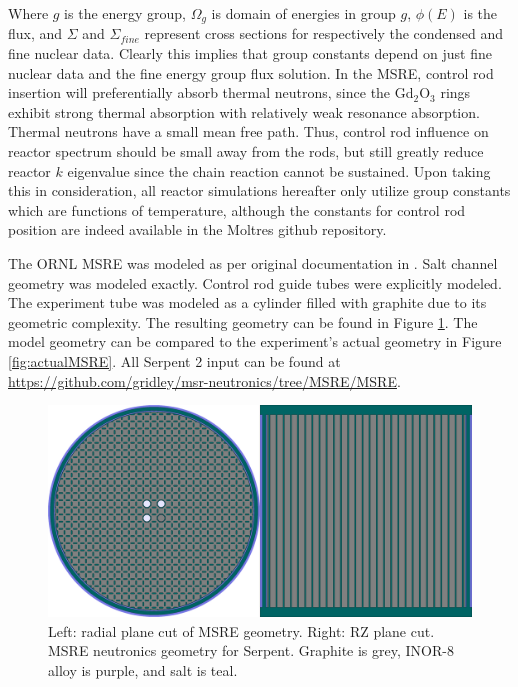 Where $g$ is the energy group, $\Omega_g$ is domain of energies in group $g$, $\phi(E)$ is the flux, and $\Sigma$ and $\Sigma_{fine}$ represent cross sections for respectively the condensed and fine nuclear data. Clearly this implies that group constants depend on just fine nuclear data and the fine energy group flux solution. In the MSRE, control rod insertion will preferentially absorb thermal neutrons, since the Gd$_2$O$_3$ rings exhibit strong thermal absorption with relatively weak resonance absorption. Thermal neutrons have a small mean free path. Thus, control rod influence on reactor spectrum should be small away from the rods, but still greatly reduce reactor $k$ eigenvalue since the chain reaction cannot be sustained. Upon taking this in consideration, all reactor simulations hereafter only utilize group constants which are functions of temperature, although the constants for control rod position are indeed available in the Moltres github repository.

The ORNL MSRE was modeled as per original documentation in \cite{robertson_msre}. Salt channel geometry was modeled exactly. Control rod guide tubes were explicitly modeled. The experiment tube was modeled as a cylinder filled with graphite due to its geometric complexity. The resulting geometry can be found in Figure \ref{fig:msreGeometry}. The model geometry can be compared to the experiment's actual geometry in Figure \ref{fig:actualMSRE}. All Serpent 2 input can be found at \url{https://github.com/gridley/msr-neutronics/tree/MSRE/MSRE}. 

\begin{figure}[ht]
\includegraphics[width=\textwidth]{msreSerpGeom.png}
\caption{Left: radial plane cut of MSRE geometry. Right: RZ plane cut. MSRE neutronics geometry for Serpent. Graphite is grey, INOR-8 alloy is purple, and salt is teal.}
\label{fig:msreGeometry}
\end{figure}

